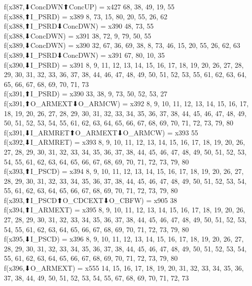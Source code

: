 f(x387,⬇ConcDWN⬆ConcUP) = x427 {68, 38, 49, 19, 55} \\
f(x388,⬆I_PSRD) = x389 {8, 73, 15, 80, 20, 55, 26, 62} \\
f(x388,⬆I_PSRD⬇ConcDWN) = x390 {48, 73, 55} \\
f(x388,⬇ConcDWN) = x391 {38, 72, 9, 79, 50, 55} \\
f(x389,⬇ConcDWN) = x390 {32, 67, 36, 69, 38, 8, 73, 46, 15, 20, 55, 26, 62, 63} \\
f(x389,⬇I_PSRD⬇ConcDWN) = x391 {67, 80, 10, 35} \\
f(x390,⬇I_PSRD) = x391 {8, 9, 11, 12, 13, 14, 15, 16, 17, 18, 19, 20, 26, 27, 28, 29, 30, 31, 32, 33, 36, 37, 38, 44, 46, 47, 48, 49, 50, 51, 52, 53, 55, 61, 62, 63, 64, 65, 66, 67, 68, 69, 70, 71, 73} \\
f(x391,⬆I_PSRD) = x390 {33, 38, 9, 73, 50, 52, 53, 27} \\
f(x391,⬆O_ARMEXT⬇O_ARMCW) = x392 {8, 9, 10, 11, 12, 13, 14, 15, 16, 17, 18, 19, 20, 26, 27, 28, 29, 30, 31, 32, 33, 34, 35, 36, 37, 38, 44, 45, 46, 47, 48, 49, 50, 51, 52, 53, 54, 55, 61, 62, 63, 64, 65, 66, 67, 68, 69, 70, 71, 72, 73, 79, 80} \\
f(x391,⬇I_ARMRET⬆O_ARMEXT⬇O_ARMCW) = x393 {55} \\
f(x392,⬇I_ARMRET) = x393 {8, 9, 10, 11, 12, 13, 14, 15, 16, 17, 18, 19, 20, 26, 27, 28, 29, 30, 31, 32, 33, 34, 35, 36, 37, 38, 44, 45, 46, 47, 48, 49, 50, 51, 52, 53, 54, 55, 61, 62, 63, 64, 65, 66, 67, 68, 69, 70, 71, 72, 73, 79, 80} \\
f(x393,⬆I_PSCD) = x394 {8, 9, 10, 11, 12, 13, 14, 15, 16, 17, 18, 19, 20, 26, 27, 28, 29, 30, 31, 32, 33, 34, 35, 36, 37, 38, 44, 45, 46, 47, 48, 49, 50, 51, 52, 53, 54, 55, 61, 62, 63, 64, 65, 66, 67, 68, 69, 70, 71, 72, 73, 79, 80} \\
f(x393,⬆I_PSCD⬆O_CDCEXT⬇O_CBFW) = x905 {38} \\
f(x394,⬆I_ARMEXT) = x395 {8, 9, 10, 11, 12, 13, 14, 15, 16, 17, 18, 19, 20, 26, 27, 28, 29, 30, 31, 32, 33, 34, 35, 36, 37, 38, 44, 45, 46, 47, 48, 49, 50, 51, 52, 53, 54, 55, 61, 62, 63, 64, 65, 66, 67, 68, 69, 70, 71, 72, 73, 79, 80} \\
f(x395,⬇I_PSCD) = x396 {8, 9, 10, 11, 12, 13, 14, 15, 16, 17, 18, 19, 20, 26, 27, 28, 29, 30, 31, 32, 33, 34, 35, 36, 37, 38, 44, 45, 46, 47, 48, 49, 50, 51, 52, 53, 54, 55, 61, 62, 63, 64, 65, 66, 67, 68, 69, 70, 71, 72, 73, 79, 80} \\
f(x396,⬇O_ARMEXT) = x555 {14, 15, 16, 17, 18, 19, 20, 31, 32, 33, 34, 35, 36, 37, 38, 44, 49, 50, 51, 52, 53, 54, 55, 67, 68, 69, 70, 71, 72, 73} \\
